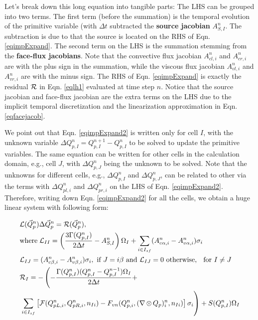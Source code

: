 \documentclass[12pt, letterpaper]{report}
\begin{document}
Let's break down this long equation into tangible parts: The LHS can be grouped into two terms. The
first term (before the summation) is the temporal evolution of the primitive variable (with $\Delta
t$ subtracted the {\bf source jacobian} $A_{S,I}^n$. The subtraction is due to that the source is
located on the RHS of Eqn. \ref{eqimpExpand}. The second term on the LHS is the summation stemming
from the {\bf face-flux jacobians}. Note that the convective flux jacobian $A_{cl,i}^n$ and
$A_{cr,i}^n$ are with the plus sign in the summation, while the viscous flux jacobian $A_{vl,i}^n$
and $A_{vr,i}^n$ are with the minus sign. The RHS of Eqn. \ref{eqimpExpand} is exactly the residual
$\mathcal{R}$ in Eqn. \ref{eqlh1} evaluated at time step $n$. Notice that the source jacobian and face-flux
jacobian are the extra terms on the LHS due to the implicit temporal discretization and the
linearization approximation in Eqn. \ref{eqfacejacob}. \paraspace

We point out that Eqn. \ref{eqimpExpand2} is written only for cell $I$, with the unknown variable
$\Delta Q_{p,I}^n = Q_{p,I}^{n+1} - Q_{p,I}^n$ to be solved to update the primitive variables. The
same equation can be written for other cells in the calculation domain, e.g., cell $J$, with $\Delta
Q_{p,J}^n$ being the unknown to be solved. Note that the unknowns for different cells, e.g.,
$\Delta Q_{p,I}^n$ and $\Delta Q_{p,J}^n$, can be related to other via the terms with $\Delta
Q_{pl,i}^n$ and $\Delta Q_{pr,i}^n$ on the LHS of Eqn. \ref{eqimpExpand2}. Therefore, writing down
Eqn. \ref{eqimpExpand2} for all the cells, we obtain a huge linear system with following form:

\begin{align}\label{eqlh2}
   \begin{split}
      & \mathcal{L}(\vec{Q}_p^n) \Delta \vec{Q}_p^n = \mathcal{R}(\vec{Q}_p^n), \\ & \textrm{where} \; \mathcal{L}_{II} =
      \left(\frac{3\Gamma(Q_{p,I}^n)}{2\Delta t} - A_{S,I}^n\right)\Omega_I + \sum_{i \in I_{sf}}
      (A_{c\alpha, i}^n - A_{v\alpha, i}^n) \sigma_i \\ &\mathcal{L}_{IJ} = (A_{c\beta,
         i}^n - A_{v\beta, i}^n) \sigma_i,  \textrm{ if } J = i\beta \textrm{ and } \mathcal{L}_{IJ} = 0
         \textrm{ otherwise, }\; \textrm{ for } I \neq J \\ & \mathcal{R}_I = -\left(-\frac{\Gamma(Q_{p,I}^n)
   (Q_{p,I}^n - Q_{p,I}^{n-1})\Omega_I}{2\Delta t} + \right.\\ &\left.\sum_{i \in
   I_{sf}}\left[\mathcal{F}(Q_{pL,i}^n, Q_{pR,i}^n, n_{Ii}) - F_{vn}(Q_{p,i}^n, (\nabla
   \mathop{\otimes} Q_p)_i^n, n_{Ii})\right]\sigma_i\right) + S(Q_{p,I}^n)\Omega_I
   \end{split}
\end{align}
\end{document}
